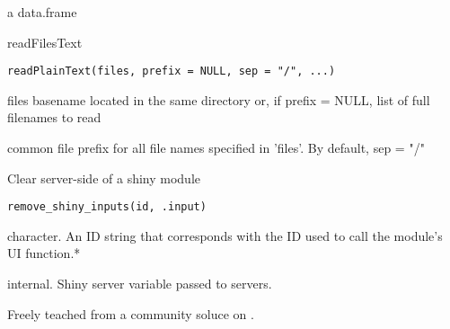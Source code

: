 \documentclass[letterpaper]{book}
\begin{document}
%
\begin{Value}
a data.frame
\end{Value}
%
\begin{Description}\relax
readFilesText
\end{Description}
%
\begin{Usage}
\begin{verbatim}
readPlainText(files, prefix = NULL, sep = "/", ...)
\end{verbatim}
\end{Usage}
%
\begin{Arguments}
\begin{ldescription}
\item[\code{files}] files basename located in the same directory or,
if prefix = NULL, list of full filenames to read

\item[\code{prefix}] common file prefix for all file names
specified in 'files'. By default, sep = "/"
\end{ldescription}
\end{Arguments}
%
\begin{Description}\relax
Clear server-side of a shiny module
\end{Description}
%
\begin{Usage}
\begin{verbatim}
remove_shiny_inputs(id, .input)
\end{verbatim}
\end{Usage}
%
\begin{Arguments}
\begin{ldescription}
\item[\code{id}] character. An ID string that corresponds with the ID used to call
the module's UI function.*

\item[\code{.input}] internal. Shiny server  variable passed to servers.
\end{ldescription}
\end{Arguments}
%
\begin{Details}\relax
Freely teached from a community soluce on
.
\end{Details}
\end{document}
